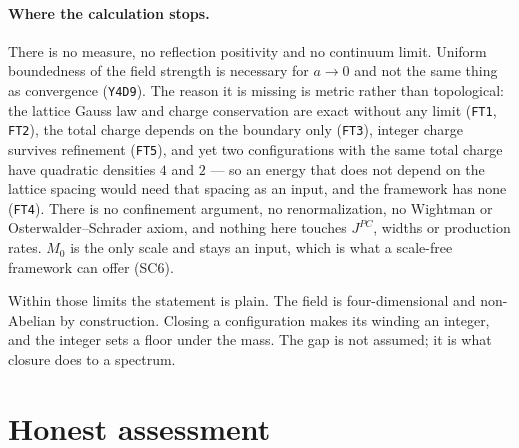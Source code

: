 \documentclass[aps,prd,preprint,superscriptaddress,amsmath,amssymb]{revtex4-2}
\begin{document}
\paragraph{Where the calculation stops.}
There is no measure, no reflection positivity and no continuum limit.
Uniform boundedness of the field strength is necessary for $a\to0$ and not the
same thing as convergence (\texttt{Y4D9}).  The reason it is missing is metric
rather than topological: the lattice Gauss law and charge conservation are
exact without any limit (\texttt{FT1}, \texttt{FT2}), the total charge depends
on the boundary only (\texttt{FT3}), integer charge survives refinement
(\texttt{FT5}), and yet two configurations with the same total charge have
quadratic densities $4$ and $2$ --- so an energy that does not depend on the
lattice spacing would need that spacing as an input, and the framework has
none (\texttt{FT4}).  There is no confinement argument, no renormalization, no
Wightman or Osterwalder--Schrader axiom, and nothing here touches $J^{PC}$,
widths or production rates.  $M_0$ is the only scale and stays an input,
which is what a scale-free framework can offer (SC6).

Within those limits the statement is plain.  The field is four-dimensional and
non-Abelian by construction.  Closing a configuration makes its winding an
integer, and the integer sets a floor under the mass.  The gap is not assumed;
it is what closure does to a spectrum.

\section{Honest assessment}
\label{sec:honest}
\end{document}
